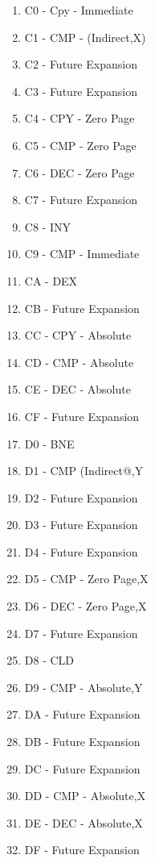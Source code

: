 \documentclass{article}
\begin{document}
\begin{multicols}{2}
\begin{enumerate}[label=\enumHex*,start=0]
    \item C0 - Cpy - Immediate            
    \item C1 - CMP - (Indirect,X)         
    \item C2 - Future Expansion           
    \item C3 - Future Expansion           
    \item C4 - CPY - Zero Page            
    \item C5 - CMP - Zero Page            
    \item C6 - DEC - Zero Page            
    \item C7 - Future Expansion           
    \item C8 - INY                        
    \item C9 - CMP - Immediate            
    \item CA - DEX                        
    \item CB - Future Expansion           
    \item CC - CPY - Absolute             
    \item CD - CMP - Absolute             
    \item CE - DEC - Absolute             
    \item CF - Future Expansion           
    \item D0 - BNE                        
    \item D1 - CMP   (Indirect@,Y         
    \item D2 - Future Expansion           
    \item D3 - Future Expansion           
    \item D4 - Future Expansion           
    \item D5 - CMP - Zero Page,X          
    \item D6 - DEC - Zero Page,X          
    \item D7 - Future Expansion           
    \item D8 - CLD                        
    \item D9 - CMP - Absolute,Y           
    \item DA - Future Expansion           
    \item DB - Future Expansion           
    \item DC - Future Expansion           
    \item DD - CMP - Absolute,X           
    \item DE - DEC - Absolute,X           
    \item DF - Future Expansion           

\end{enumerate}
\end{multicols}
\end{document}
